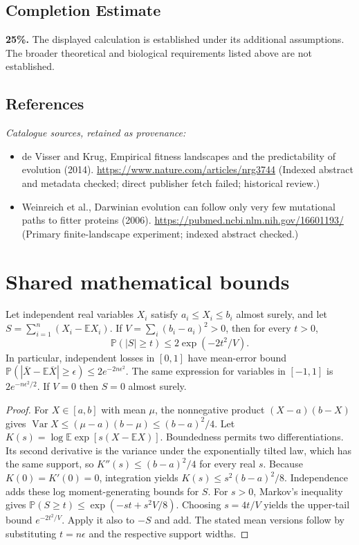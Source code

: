 \documentclass[11pt]{article}
\begin{document}
\subsection{Completion Estimate}
\textbf{25\%.} The displayed calculation is established under its additional assumptions. The broader theoretical and biological requirements listed above are not established.
\subsection{References}
\noindent\emph{Catalogue sources, retained as provenance:}
\begin{itemize}
\item de Visser and Krug, Empirical fitness landscapes and the predictability of evolution (2014). \url{https://www.nature.com/articles/nrg3744} (Indexed abstract and metadata checked; direct publisher fetch failed; historical review.)
\item Weinreich et al., Darwinian evolution can follow only very few mutational paths to fitter proteins (2006). \url{https://pubmed.ncbi.nlm.nih.gov/16601193/} (Primary finite-landscape experiment; indexed abstract checked.)
\end{itemize}




\section{Shared mathematical bounds}\label{app:bounds}
\begin{lemma}\label{lem:bounded}
Let independent real variables $X_i$ satisfy $a_i\leq X_i\leq b_i$ almost surely,
and let $S=\sum_{i=1}^n(X_i-\mathbb{E} X_i)$. If
$V=\sum_i(b_i-a_i)^2>0$, then for every $t>0$,
\[
 \mathbb{P}(|S|\geq t)\leq 2\exp(-2t^2/V).
\]
In particular, independent losses in $[0,1]$ have mean-error bound
$\mathbb{P}(|\overline X-\mathbb{E}\overline X|\geq\epsilon)
\leq2e^{-2n\epsilon^2}$. The same expression for variables in $[-1,1]$
is $2e^{-n\epsilon^2/2}$. If $V=0$ then $S=0$ almost surely.
\end{lemma}
\begin{proof}
For $X\in[a,b]$ with mean $\mu$, the nonnegative product
$(X-a)(b-X)$ gives
$\operatorname{Var} X\leq(\mu-a)(b-\mu)\leq(b-a)^2/4$.
Let $K(s)=\log\mathbb{E}\exp[s(X-\mathbb{E} X)]$.
Boundedness permits two differentiations. Its second derivative is the variance
under the exponentially tilted law, which has the same support, so
$K''(s)\leq(b-a)^2/4$ for every real $s$.
Because $K(0)=K'(0)=0$, integration yields
$K(s)\leq s^2(b-a)^2/8$.
Independence adds these log moment-generating bounds for $S$.
For $s>0$, Markov's inequality gives
$\mathbb{P}(S\geq t)\leq\exp(-st+s^2V/8)$.
Choosing $s=4t/V$ yields the upper-tail bound $e^{-2t^2/V}$.
Apply it also to $-S$ and add. The stated mean versions follow by substituting
$t=n\epsilon$ and the respective support widths.
\end{proof}
\end{document}
